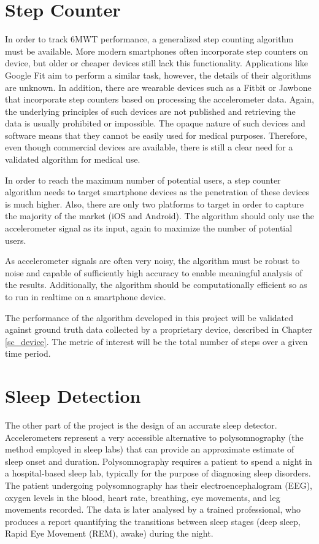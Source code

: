         \section{Step Counter}

            In order to track 6MWT performance, a generalized step counting algorithm must be available. More modern smartphones often incorporate step counters on device, but older or cheaper devices still lack this functionality. Applications like Google Fit aim to perform a similar task, however, the details of their algorithms are unknown. In addition, there are wearable devices such as a Fitbit or Jawbone that incorporate step counters based on processing the accelerometer data. Again, the underlying principles of such devices are not published and retrieving the data is usually prohibited or impossible. The opaque nature of such devices and software means that they cannot be easily used for medical purposes. Therefore, even though commercial devices are available, there is still a clear need for a validated algorithm for medical use.

            In order to reach the maximum number of potential users, a step counter algorithm needs to target smartphone devices as the penetration of these devices is much higher. Also, there are only two platforms to target in order to capture the majority of the market (iOS and Android). The algorithm should only use the accelerometer signal as its input, again to maximize the number of potential users.

            As accelerometer signals are often very noisy, the algorithm must be robust to noise and capable of sufficiently high accuracy to enable meaningful analysis of the results. Additionally, the algorithm should be computationally efficient so as to run in realtime on a smartphone device.

            The performance of the algorithm developed in this project will be validated against ground truth data collected by a proprietary device, described in Chapter \ref{sc_device}. The metric of interest will be the total number of steps over a given time period.

        \section{Sleep Detection}

            The other part of the project is the design of an accurate sleep detector. Accelerometers represent a very accessible alternative to polysomnography (the method employed in sleep labs) that can provide an approximate estimate of sleep onset and duration. Polysomnography requires a patient to spend a night in a hospital-based sleep lab, typically for the purpose of diagnosing sleep disorders. The patient undergoing polysomnography has their electroencephalogram (EEG), oxygen levels in the blood, heart rate, breathing, eye movements, and leg movements recorded. The data is later analysed by a trained professional, who produces a report quantifying the transitions between sleep stages (deep sleep, Rapid Eye Movement (REM), awake) during the night.

